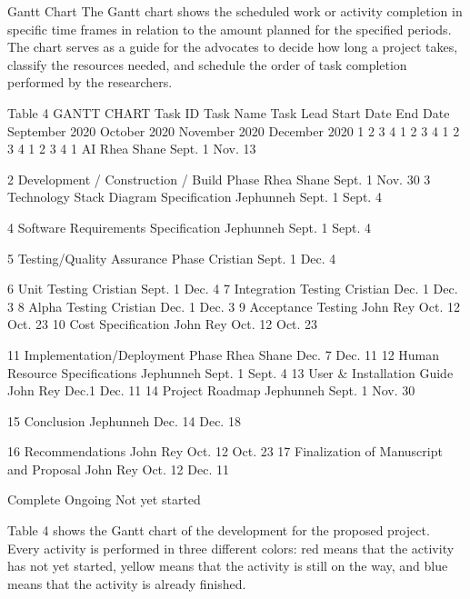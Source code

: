 Gantt Chart
The Gantt chart shows the scheduled work or activity completion in specific time frames in relation to the amount planned for the specified periods. The chart serves as a guide for the advocates to decide how long a project takes, classify the resources needed, and schedule the order of task completion performed by the researchers.

Table 4
GANTT CHART
Task ID	Task Name	Task Lead	Start Date	End Date	September 2020	October 2020	November 2020	December 2020
					1	2	3	4	1	2	3	4	1	2	3	4	1	2	3	4
1	AI	Rhea Shane	Sept. 1	Nov. 13											
					
2	Development / Construction / Build Phase	Rhea Shane	Sept. 1	Nov. 30																
3	Technology
Stack Diagram Specification	Jephunneh	Sept. 1	Sept. 4					
		
									
																				
4	Software Requirements Specification	Jephunneh	Sept. 1	Sept. 4					
											
																				
5	Testing/Quality Assurance Phase	Cristian	Sept. 1	Dec. 4																
																				
6	Unit Testing	Cristian	Sept. 1	Dec. 4																
7	Integration Testing	Cristian	Dec. 1	Dec. 3																
8	Alpha Testing	Cristian	Dec. 1	Dec. 3																
9	Acceptance Testing	John Rey	Oct. 12	Oct. 23																
10	Cost Specification	John Rey	Oct. 12	Oct. 23																
																				
 11	Implementation/Deployment Phase	Rhea Shane	Dec. 7	Dec. 11																
12	Human
Resource Specifications	Jephunneh	Sept. 1	Sept. 4																
13	User & Installation Guide	John Rey	Dec.1	Dec. 11																
14	Project Roadmap	Jephunneh	Sept. 1 	Nov. 30																
																				
15	Conclusion	Jephunneh	Dec. 14	Dec. 18																
																				
16	Recommendations	John Rey	Oct. 12	Oct. 23																
17	Finalization
of
Manuscript and Proposal	John Rey	Oct. 12	 Dec. 11																

				
      Complete		     Ongoing	           Not yet started

Table 4 shows the Gantt chart of the development for the proposed project. Every activity is performed in three different colors: red means that the activity has not yet started, yellow means that the activity is still on the way, and blue means that the activity is already finished.




